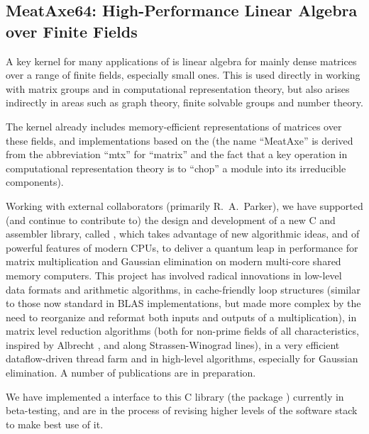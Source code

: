 


\subsection{MeatAxe64: High-Performance Linear Algebra over Finite Fields}\label{meataxe64}

A key kernel for many applications of \GAP is linear algebra for
mainly dense matrices over
a range of finite fields, especially small ones. This is used directly in working with
matrix groups and in computational representation theory, but also
arises indirectly in areas such as graph theory, finite solvable
groups and number theory. 

The \GAP kernel already includes memory-efficient
representations of matrices over these fields, and implementations
based on the  (the name ``MeatAxe'' is derived from the
abbreviation ``mtx'' for ``matrix'' and the fact that a key operation
in computational representation theory is to ``chop'' a module into
its irreducible components).

Working with external collaborators (primarily R.~A.~Parker), we have
supported (and continue to contribute to) the design and development
of a new C and assembler library, called , which takes
advantage of new algorithmic ideas, and of powerful features of modern
CPUs, to deliver a quantum leap in performance for matrix
multiplication and Gaussian elimination on modern multi-core shared
memory computers. This project has involved radical innovations in
low-level data formats and arithmetic algorithms, in cache-friendly
loop structures (similar to those now standard in BLAS implementations,
but made more complex by the need to reorganize and reformat both
inputs and outputs of a multiplication), in matrix level reduction
algorithms (both for non-prime fields of all characteristics, inspired
by Albrecht \cite{m4rie}, and along Strassen-Winograd lines), in a
very efficient dataflow-driven thread farm and in high-level
algorithms, especially for Gaussian elimination. A number of
publications are in preparation.

We have implemented a \GAP interface to this C library (the
 \GAP package \cite{meataxe64}) currently in beta-testing,
and are in the process of revising higher levels of the software stack
to make best use of it.

